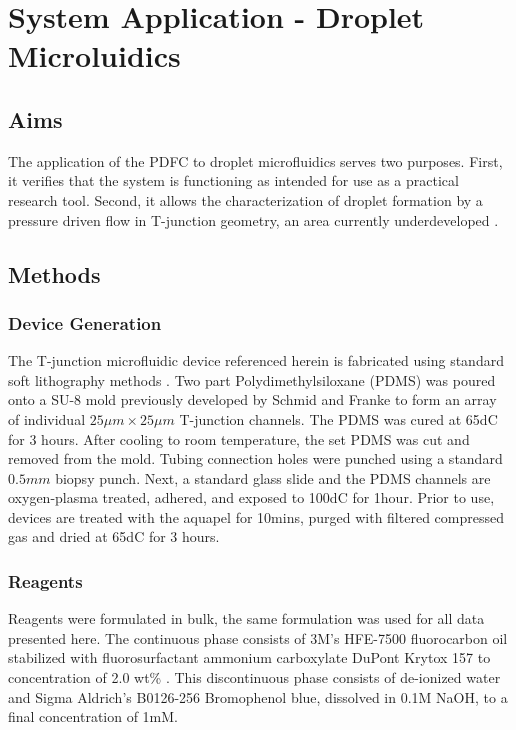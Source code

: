 \chapter{System Application - Droplet Microluidics}
\section{Aims}
The application of the PDFC to droplet microfluidics serves two purposes. First, it verifies that the system is functioning as intended for use as a practical research tool. Second, it allows the characterization of droplet formation by a pressure driven flow in T-junction geometry, an area currently underdeveloped \cite{Christopher2008}. 

\section{Methods}
\subsection{Device Generation}

The T-junction microfluidic device referenced herein is fabricated using standard soft lithography methods \cite{Stroock2002}. Two part Polydimethylsiloxane (PDMS) was poured onto a SU-8 mold previously developed by Schmid and Franke \cite{Schmid2014c} to form an array of individual $25 \mu m \times 25 \mu m$ T-junction channels. The PDMS was cured at 65dC for 3 hours. After cooling to room temperature, the set PDMS was cut and removed from the mold. Tubing connection holes were punched using a standard $0.5mm$ biopsy punch. Next, a standard glass slide and the PDMS channels are oxygen-plasma treated, adhered, and exposed to 100dC for 1hour. Prior to use, devices are treated with the aquapel for 10mins, purged with filtered compressed gas and dried at 65dC for 3 hours. 

\subsection{Reagents}

Reagents were formulated in bulk, the same formulation was used for all data presented here. The continuous phase consists of 3M's HFE-7500 fluorocarbon oil stabilized with fluorosurfactant ammonium carboxylate DuPont Krytox 157 to concentration of 2.0 wt\% . This discontinuous phase consists of de-ionized water and Sigma Aldrich's B0126-256 Bromophenol blue, dissolved in 0.1M NaOH, to a final concentration of 1mM.

